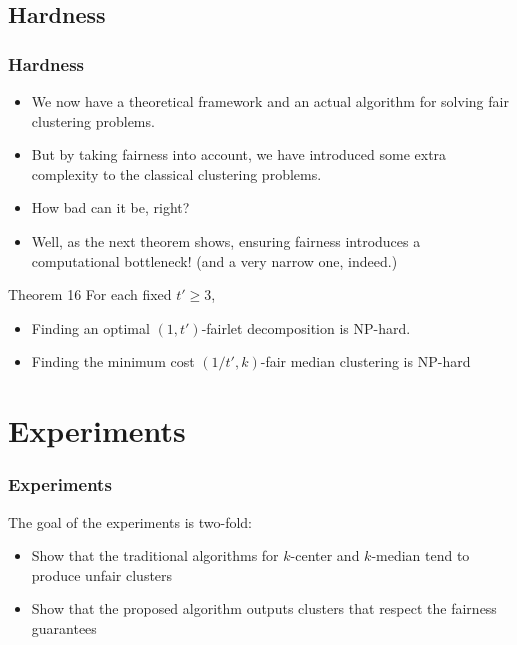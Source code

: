 \documentclass{beamer}
\begin{document}

\subsection{Hardness}

\begin{frame}
\frametitle{Hardness}

\begin{itemize}
	\item We now have a theoretical framework and an actual algorithm for solving fair clustering problems. \pause
	
	\item But by taking fairness into account, we have introduced some extra complexity to the classical clustering problems. \pause
	
	\item How bad can it be, right? \pause
	
	\item Well, as the next theorem shows, ensuring fairness introduces a computational bottleneck! (and a very narrow one, indeed.) \pause
\end{itemize}

\begin{block}{Theorem 16}
For each fixed $t' \geq 3$,

\begin{itemize}
	\item Finding an optimal $(1, t')$-fairlet decomposition is \alert{NP-hard}.
	\item Finding the minimum cost $(1/t', k)$-fair median clustering is \alert{NP-hard}
\end{itemize}

\end{block}

\end{frame}


\section{Experiments}

\begin{frame}
\frametitle{Experiments}

The goal of the experiments is two-fold: \pause

\begin{itemize}
	\item Show that the traditional algorithms for $k$-center and $k$-median tend to produce unfair clusters \pause

	\item Show that the proposed algorithm outputs clusters that respect the fairness guarantees
\end{itemize}

\end{frame}
\end{document}
